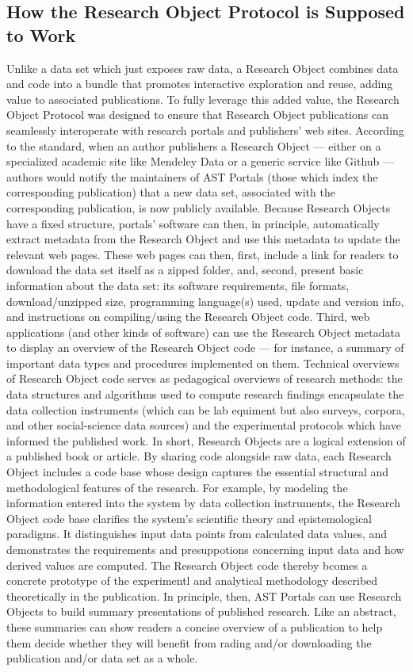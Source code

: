 \documentclass[11pt,letterpaper]{article}
\begin{document}
\subsection{How the Research Object Protocol is Supposed to Work}
Unlike a data set which just exposes raw data, a 
Research Object combines data and code into a bundle 
that promotes interactive exploration and reuse, 
adding value to associated publications.  
To fully leverage this added value, the Research Object 
Protocol was designed to ensure that Research Object 
publications can seamlessly interoperate 
with research portals and publishers' web sites.
\p{}
According to the standard, when an author publishers a 
Research Object --- either on a specialized academic 
site like Mendeley Data or a generic service like 
Github --- authors would notify the maintainers of 
AST Portals (those which index the corresponding publication) 
that a new data set, associated with the corresponding 
publication, is now publicly available.  Because 
Research Objects have a fixed structure, portals' 
software can then, in principle, automatically 
extract metadata from the Research Object and 
use this metadata to update the relevant web pages. 
\p{} 
These web pages can 
then, first, include a link for readers to 
download the data set itself as a zipped folder, 
and, second, present basic information about 
the data set: its software requirements, 
file formats, download/unzipped size, programming 
language(s) used, update and version info, and 
instructions on compiling/using the 
Research Object code.  Third, 
web applications (and other kinds of software) can use 
the Research Object metadata to display an overview of 
the Research Object code --- for instance, a summary of 
important data types and procedures implemented on them.  
Technical overviews of Research Object code 
serves as pedagogical overviews of research 
methods: the data structures and algorithms used to compute 
research findings encapsulate the data collection 
instruments (which can be lab equiment but also surveys, 
corpora, and other social-science data sources) 
and the experimental protocols which have informed 
the published work.
\p{} 
In short, Research Objects are a logical extension of a 
published book or article.  By sharing code alongside raw 
data, each Research Object includes a code base whose 
design captures the essential structural and methodological 
features of the research.  For example, by 
modeling the information entered into the system by 
data collection instruments, the Research Object 
code base clarifies the system's scientific theory and 
epistemological paradigms.  It distinguishes 
input data points from calculated data values, and 
demonstrates the requirements and presuppotions 
concerning input data and how derived values 
are computed.  The 
Research Object code thereby bcomes a concrete 
prototype of the experimentl and analytical 
methodology described theoretically in the publication.
\p{}
In principle, then, AST  
Portals can use Research Objects to build summary 
presentations of published research.  Like an 
abstract, these summaries can show readers a 
concise overview of a publication to help them 
decide whether they will benefit from rading and/or 
downloading the publication and/or data set as a whole.
\p{}
\end{document}
